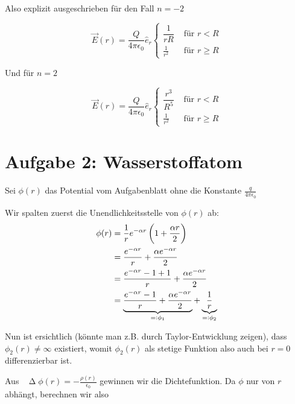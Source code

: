 \documentclass[a4paper,german,12pt,smallheadings]{scrartcl}
\begin{document}
\begin{enumerate}[a)]
    Also explizit ausgeschrieben für den Fall $n = -2$

    \begin{equation}
      \vec{E}(r) = \dfrac{Q}{4 \pi \epsilon_0} \hat{e}_r \begin{cases}
        \dfrac{1}{rR} & \text{ für } r < R \\
        \frac{1}{r^2} & \text{ für } r \ge R
      \end{cases}
    \end{equation}

    Und für $n = 2$

    \begin{equation}
      \vec{E}(r) = \dfrac{Q}{4 \pi \epsilon_0} \hat{e}_r \begin{cases}
        \dfrac{r^3}{R^5} & \text{ für } r < R \\
        \frac{1}{r^2} & \text{ für } r \ge R
      \end{cases}
    \end{equation}

\end{enumerate}

\section*{Aufgabe 2: Wasserstoffatom}
\newcommand*\laplace{\mathop{}\!\mathbin\Delta}

Sei $\phi(r)$ das Potential vom Aufgabenblatt ohne die Konstante $\frac{q}{4 \pi \epsilon_0}$

Wir spalten zuerst die Unendlichkeitsstelle von $\phi(r)$ ab:
\begin{align}
  \phi(r) &= \frac{1}{r} e^{-\alpha r} \del{1 + \frac{\alpha r}{2}} \\
          &= \frac{e^{-\alpha r}}{r} + \frac{\alpha e^{-\alpha r}}{2} \\
          &= \frac{e^{-\alpha r} - 1 + 1}{r} + \frac{\alpha e^{-\alpha r}}{2} \\
          &= \underbrace{\frac{e^{-\alpha r} - 1}{r} + \frac{\alpha e^{-\alpha r}}{2}}_{=: \phi_1} + \underbrace{\frac{1}{r}}_{=: \phi_2} \\
\end{align}

Nun ist ersichtlich (könnte man z.B. durch Taylor-Entwicklung zeigen), dass
$\phi_2(r) \neq \infty$ existiert, womit $\phi_2(r)$ als stetige Funktion also
auch bei $r = 0$ differenzierbar ist.

Aus $\laplace \phi(r) = -\frac{\rho(r)}{\epsilon_0}$ gewinnen wir die
Dichtefunktion. Da $\phi$ nur von $r$ abhängt, berechnen wir also
\end{document}
